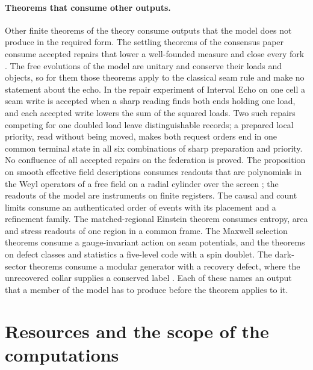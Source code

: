 \documentclass[11pt]{article}
\theoremstyle{definition}
\theoremstyle{remark}
\theoremstyle{plain}
\begin{document}
\paragraph{Theorems that consume other outputs.}
Other finite theorems of the theory consume outputs that the model does not
produce in the required form. The settling theorems of the consensus paper
consume accepted repairs that lower a well-founded measure and close every
fork \cite{ophconsensus}. The free evolutions of the model are unitary and
conserve their loads and objects, so for them those theorems apply to the
classical seam rule and make no statement about the echo. In the repair
experiment of Interval Echo on one cell a seam write is accepted when a
sharp reading finds both ends holding one load, and each accepted write
lowers the sum of the squared loads. Two such repairs competing for one
doubled load leave distinguishable records; a prepared local priority,
read without being moved, makes both request orders end in one common
terminal state in all six combinations of sharp preparation and priority.
No confluence of all accepted repairs on the federation is proved. The
proposition on smooth effective
field descriptions consumes readouts that are polynomials in the Weyl
operators of a free field on a radial cylinder over the screen
\cite{ophspacetime}; the readouts of the model are instruments on finite
registers. The causal and count limits consume an authenticated order of
events with its placement and a refinement family. The matched-regional
Einstein theorem consumes entropy, area and stress readouts of one region
in a common frame. The Maxwell selection theorems consume a gauge-invariant
action on seam potentials, and the theorems on defect classes and
statistics a five-level code with a spin doublet. The dark-sector theorems
consume a modular generator with a recovery defect, where the unrecovered
collar supplies a conserved label \cite{ophdarkmatter}. Each of these names
an output that a member of the model has to produce before the theorem
applies to it.


\section{Resources and the scope of the computations}
\label{sec:resources}
\end{document}

